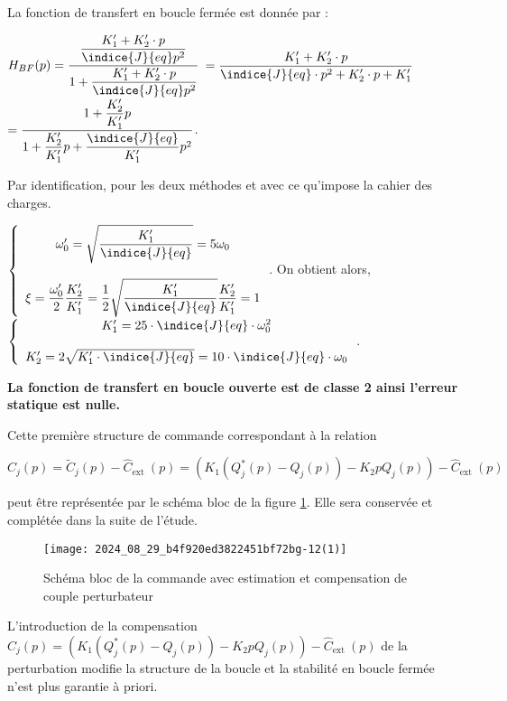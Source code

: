 \begin{corrige}
\begin{multicols}{2}
La fonction de transfert en boucle fermée est donnée par : 

$
H_{BF}(p)=\dfrac{\dfrac{K'_1+K'_2\cdot p}{\indice{J}{eq}p^2}}{1+\dfrac{K'_1+K'_2\cdot p}{\indice{J}{eq}p^2}}$
$ =\dfrac{K'_1+K'_2\cdot p}{\indice{J}{eq}\cdot p^2+K'_2\cdot p+K'_1}$
$=\dfrac{1+\dfrac{K'_2}{K'_1}p}{1+\dfrac{K'_2}{K'_1}p+\dfrac{\indice{J}{eq}}{K'_1}p^2}$.

\end{multicols}
Par identification, pour les deux méthodes et avec ce qu'impose la cahier des charges.

$
\left\{
\begin{array}{c}
\omega'_0=\sqrt{\dfrac{K'_1}{\indice{J}{eq}}}=5\omega_0\\
\\
\xi=\dfrac{\omega'_0}{2}\dfrac{K'_2}{K'_1}=\dfrac{1}{2}\sqrt{\dfrac{K'_1}{\indice{J}{eq}}}\dfrac{K'_2}{K'_1}=1
\end{array}
\right.
$. 
On obtient alors,
$
\left\{
\begin{array}{c}
K'_1=25\cdot \indice{J}{eq}\cdot \omega_0^2\\
\\
K'_2=2\sqrt{K'_1\cdot \indice{J}{eq}}=10\cdot \indice{J}{eq}\cdot \omega_0
\end{array}
\right.
$.

\textbf{La fonction de transfert en boucle ouverte est de classe 2 ainsi l'erreur statique est nulle. }
\end{corrige}
\else
\fi


Cette première structure de commande correspondant à la relation

$$
C_{j}(p)=\tilde{C}_{j}(p)-\hat{C}_{\text {ext }}(p)=\left(K_{1}\left(Q_{j}^{*}(p)-Q_{j}(p)\right)-K_{2} p Q_{j}(p)\right)-\hat{C}_{\text {ext }}(p)
$$

peut être représentée par le schéma bloc de la figure \ref{fig_14}. Elle sera conservée et complétée dans la suite de l'étude.


\begin{figure}[!h]
\centering
\texttt{[image: 2024\_08\_29\_b4f920ed3822451bf72bg-12(1)]}
\caption{\label{fig_14} Schéma bloc de la commande avec estimation et compensation de couple perturbateur}
\end{figure}


L'introduction de la compensation $C_{j}(p)=\left(K_{1}\left(Q_{j}^{*}(p)-Q_{j}(p)\right)-K_{2} p Q_{j}(p)\right)-\hat{C}_{\text {ext }}(p)$ de la perturbation modifie la structure de la boucle et la stabilité en boucle fermée n'est plus garantie à priori.

